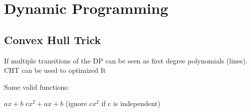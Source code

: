\chapter{Dynamic Programming}

\section{Convex Hull Trick}

    If multiple transitions of the DP can be seen as 
    first degree polynomials (lines). CHT can be used to optimized It

    Some valid functions:

    $ax + b$
    $cx^2 + ax + b$ 
    (ignore $cx^2$ if c is independent)

